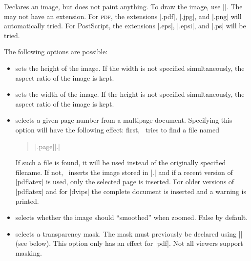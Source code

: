 \begin{command}{\pgfdeclareimage{}}
  Declares an image, but does not paint anything. To draw the image,
  use ||. The  may not
  have an extension.  For \textsc{pdf}, the extensions |.pdf|, |.jpg|,
  and |.png| will automatically tried. For PostScript, the extensions
  |.eps|, |.epsi|, and |.ps| will be tried. 

  The following options are possible:
  \begin{itemize}
  \item
     sets the height of the
    image. If the width is not specified simultaneously, the aspect
    ratio of the image is kept.
  \item
     sets the width of the
    image. If the height is not specified simultaneously, the aspect
    ratio of the image is kept.
  \item
     selects a given page number
    from a multipage document. Specifying this option will have the
    following effect: first, \pgfname\ tries to find a file named
    \begin{quote}
      |.page||.|
    \end{quote}
    If such a file is found, it will be used instead of the originally
    specified filename. If not, \pgfname\ inserts the image stored in
    |.| and if a recent version of
    |pdflatex| is used, only the selected page is inserted. For older
    versions of |pdflatex| and for |dvips| the complete document is
    inserted and a warning is printed.    
  \item
     selects whether the
    image should ``smoothed'' when zoomed. False by default.
  \item
     selects a transparency mask. The
    mask must previously be declared using |\pgfdeclaremask| (see
    below). This option only has an effect for |pdf|. Not all viewers
    support masking. 
  \end{itemize}

\begin{codeexample}
\end{codeexample}
\end{command}


